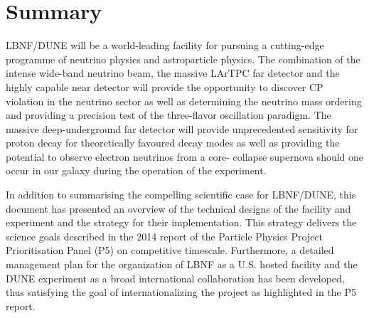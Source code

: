 

\chapter{Summary}
\label{ch:project-summary}

LBNF/DUNE will be a world-leading facility for pursuing a cutting-edge programme of neutrino physics and astroparticle physics. The 
combination of the intense wide-band neutrino beam, the massive LArTPC far detector and the highly capable near detector will provide 
the opportunity to discover CP violation in the neutrino sector as well as determining the neutrino mass ordering and providing a 
precision test of the three-flavor oscillation paradigm. The massive deep-underground far detector will provide unprecedented sensitivity 
for proton decay for theoretically favoured decay modes as well as providing the potential to observe electron neutrinos from a core-
collapse supernova should one occur in our galaxy during the operation of the experiment.

In addition to summarising the compelling scientific case for LBNF/DUNE, this document has presented an overview of the technical 
designs of the facility and experiment and the strategy for their implementation. 
This strategy delivers the science goals described in the 2014 report of the Particle Physics Project Prioritisation Panel (P5) on 
competitive timescale. Furthermore, a detailed management plan for the 
organization of LBNF as a U.S. hosted facility and the DUNE experiment 
as a broad international collaboration has been developed, thus satisfying the goal of internationalizing the project as highlighted in the 
P5 report.

